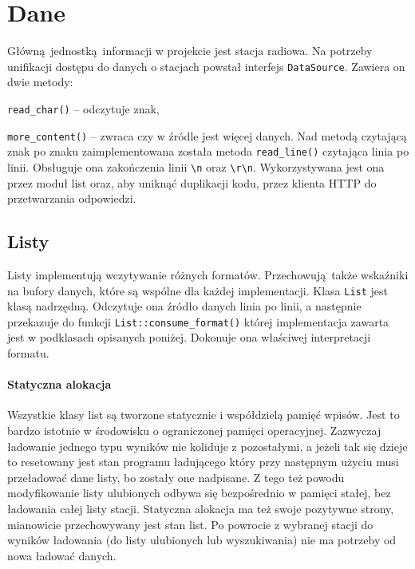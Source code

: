\documentclass[12pt]{report}
\let\tempone\itemize
\let\temptwo\enditemize
\renewenvironment{itemize}{\tempone\setlength{\itemsep}{0cm}}{\temptwo}
\begin{document}
	\section{Dane}
		Główną jednostką informacji w projekcie jest stacja radiowa. Na potrzeby unifikacji dostępu do danych o stacjach powstał interfejs \lstinline|DataSource|. Zawiera on dwie metody:
		\begin{itemize}
			\item \lstinline|read_char()| -- odczytuje znak,
			\item \lstinline|more_content()| -- zwraca czy w źródle jest więcej danych.
		\end{itemize}
		Nad metodą czytającą znak po znaku zaimplementowana została metoda \lstinline|read_line()| czytająca linia po linii. Obsługuje ona zakończenia linii \lstinline|\n| oraz \lstinline|\r\n|. Wykorzystywana jest ona przez moduł list oraz, aby uniknąć duplikacji kodu, przez klienta HTTP do przetwarzania odpowiedzi.
		
		\subsection{Listy}
			Listy implementują wczytywanie różnych formatów. Przechowują także wskaźniki na bufory danych, które są wspólne dla każdej implementacji. Klasa \lstinline|List| jest klasą nadrzędną. Odczytuje ona źródło danych linia po linii, a następnie przekazuje do funkcji \lstinline|List::consume_format()| której implementacja zawarta jest w podklasach opisanych poniżej. Dokonuje ona właściwej interpretacji formatu.
			
			\paragraph{Statyczna alokacja} Wszystkie klasy list są tworzone statycznie i współdzielą pamięć wpisów. Jest to bardzo istotnie w środowisku o ograniczonej pamięci operacyjnej. Zazwyczaj ładowanie jednego typu wyników nie koliduje z pozostałymi, a jeżeli tak się dzieje to resetowany jest stan programu ładującego który przy następnym użyciu musi przeładować dane listy, bo zostały one nadpisane. Z tego też powodu modyfikowanie listy ulubionych odbywa się bezpośrednio w pamięci stałej, bez ładowania całej listy stacji. Statyczna alokacja ma też swoje pozytywne strony, mianowicie przechowywany jest stan list. Po powrocie z wybranej stacji do wyników ładowania (do listy ulubionych lub wyszukiwania) nie ma potrzeby od nowa ładować danych.
			
\end{document}
